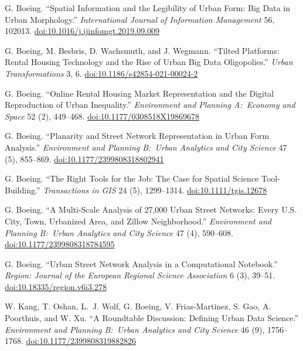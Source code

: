 \begin{tablist}
        \item[2021] \tab{}G. Boeing. \enquote{Spatial Information and the Legibility of Urban Form: Big Data in Urban Morphology.} \textit{International Journal of Information Management} 56, 102013. \href{https://doi.org/10.1016/j.ijinfomgt.2019.09.009}{doi:10.1016/j.ijinfomgt.2019.09.009}

        \item[2021] \tab{}G. Boeing, M. Besbris, D. Wachsmuth, and J. Wegmann. \enquote{Tilted Platforms: Rental Housing Technology and the Rise of Urban Big Data Oligopolies.} \textit{Urban Transformations} 3, 6. \href{https://doi.org/10.1186/s42854-021-00024-2}{doi:10.1186/s42854-021-00024-2}

        \item[2020] \tab{}G. Boeing. \enquote{Online Rental Housing Market Representation and the Digital Reproduction of Urban Inequality.} \textit{Environment and Planning A:\ Economy and Space} 52 (2), 449--468. \href{https://doi.org/10.1177/0308518X19869678}{doi:10.1177/0308518X19869678}

        \item[2020] \tab{}G. Boeing. \enquote{Planarity and Street Network Representation in Urban Form Analysis.} \textit{Environment and Planning B:\ Urban Analytics and City Science} 47 (5), 855--869. \href{https://doi.org/10.1177/2399808318802941}{doi:10.1177/2399808318802941}

        \item[2020] \tab{}G. Boeing. \enquote{The Right Tools for the Job: The Case for Spatial Science Tool-Building.} \textit{Transactions in GIS} 24 (5), 1299--1314. \href{https://doi.org/10.1111/tgis.12678}{doi:10.1111/tgis.12678}

        \item[2020] \tab{}G. Boeing. \enquote{A Multi-Scale Analysis of 27,000 Urban Street Networks: Every U.S. City, Town, Urbanized Area, and Zillow Neighborhood.} \textit{Environment and Planning B:\ Urban Analytics and City Science} 47 (4), 590--608. \href{https://doi.org/10.1177/2399808318784595}{doi:10.1177/2399808318784595}

        \item[2020] \tab{}G. Boeing. \enquote{Urban Street Network Analysis in a Computational Notebook.} \textit{Region: Journal of the European Regional Science Association} 6 (3), 39--51. \href{https://doi.org/10.18335/region.v6i3.278}{doi:10.18335/region.v6i3.278}

        \item[2019] \tab{}W. Kang, T. Oshan, L.~J. Wolf, G. Boeing, V. Frias-Martinez, S. Gao, A. Poorthuis, and W. Xu. \enquote{A Roundtable Discussion: Defining Urban Data Science.} \textit{Environment and Planning B:\ Urban Analytics and City Science} 46 (9), 1756--1768. \href{https://doi.org/10.1177/2399808319882826}{doi:10.1177/2399808319882826}


\end{tablist}
